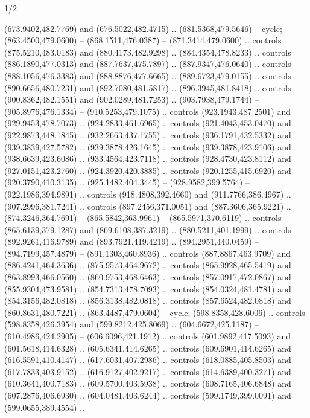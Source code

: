 \begin{flagdescription}{1/2}
\begin{scope}[shift={(2*\flaglength/3-0.25*\rb,0.51333\flagwidth)},scale=0.001715\flagwidth*\stretchfactor]
\begin{scope}[y=-1pt, x=1pt,cm={{1.04354,0.0,0.0,1.01818,(-827,-297)}}]
\begin{scope}[draw=black,line width=0.015\flagwidth]
\begin{scope}[fill=gold]
  (673.9402,482.7769) and (676.5022,482.4715) .. (681.5368,479.5646) -- cycle;
 (863.4500,479.0600) -- (868.1511,476.0387) --
  (871.3414,479.0600) .. controls (875.5210,483.0183) and (880.4173,482.9298) ..
  (884.4354,478.8233) .. controls (886.1890,477.0313) and (887.7637,475.7897) ..
  (887.9347,476.0640) .. controls (888.1056,476.3383) and (888.8876,477.6665) ..
  (889.6723,479.0155) .. controls (890.6656,480.7231) and (892.7080,481.5817) ..
  (896.3945,481.8418) .. controls (900.8362,482.1551) and (902.0289,481.7253) ..
  (903.7938,479.1744) -- (905.8976,476.1334) -- (910.5253,479.1075) .. controls
  (923.1943,487.2501) and (929.9453,478.7073) .. (924.2833,461.6965) .. controls
  (921.4043,453.0470) and (922.9873,448.1845) .. (932.2663,437.1755) .. controls
  (936.1791,432.5332) and (939.3839,427.5782) .. (939.3878,426.1645) .. controls
  (939.3878,423.9106) and (938.6639,423.6086) .. (933.4564,423.7118) .. controls
  (928.4730,423.8112) and (927.0151,423.2760) .. (924.3920,420.3885) .. controls
  (920.1255,415.6920) and (920.3790,410.3135) .. (925.1482,404.3445) --
  (928.9582,399.5764) -- (922.1986,394.9891) .. controls (918.4808,392.4660) and
  (911.7766,386.4967) .. (907.2996,381.7241) .. controls (897.2456,371.0051) and
  (887.3606,365.9221) .. (874.3246,364.7691) -- (865.5842,363.9961) --
  (865.5971,370.6119) .. controls (865.6139,379.1287) and (869.6108,387.3219) ..
  (880.5211,401.1999) .. controls (892.9261,416.9789) and (893.7921,419.4219) ..
  (894.2951,440.0459) -- (894.7199,457.4879) -- (891.1303,460.8936) .. controls
  (887.8867,463.9709) and (886.4241,464.3636) .. (875.9573,464.9672) .. controls
  (865.9928,465.5419) and (863.8993,466.0560) .. (860.9753,468.6463) .. controls
  (857.0917,472.0867) and (855.9304,473.9581) .. (854.7313,478.7093) .. controls
  (854.0324,481.4781) and (854.3156,482.0818) .. (856.3138,482.0818) .. controls
  (857.6524,482.0818) and (860.8631,480.7221) .. (863.4487,479.0604) -- cycle;
 (598.8358,428.6006) .. controls (598.8358,426.3954) and
  (599.8212,425.8069) .. (604.6672,425.1187) -- (610.4986,424.2905) --
  (606.6096,421.1912) .. controls (601.9892,417.5093) and (601.5618,414.6328) ..
  (605.6341,414.6265) .. controls (609.6901,414.6265) and (616.5591,410.4147) ..
  (617.6031,407.2986) .. controls (618.0885,405.8503) and (617.7833,403.9152) ..
  (616.9127,402.9217) .. controls (614.6389,400.3271) and (610.3641,400.7183) ..
  (609.5700,403.5938) .. controls (608.7165,406.6848) and (607.2876,406.6930) ..
  (604.0481,403.6244) .. controls (599.1749,399.0091) and (599.0655,389.4554) ..

\end{scope}
\end{scope}
\end{scope}
\end{scope}
\end{flagdescription}
